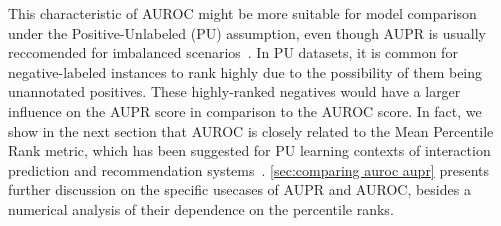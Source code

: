 
%
%
%
%


This characteristic of AUROC might be more suitable for model comparison under the Positive-Unlabeled (PU) assumption, even though AUPR is usually reccomended for imbalanced scenarios~\cite{he2009learning,saito2015precision,fernandez2018learning}.
In PU datasets, it is common for negative-labeled instances to rank highly due to the possibility of them being unannotated positives. These highly-ranked negatives would have a larger influence on the AUPR score in comparison to the AUROC score.
In fact, we show in the next section that AUROC is closely related to the Mean Percentile Rank metric, which has been suggested for PU learning contexts of interaction prediction and recommendation systems~\cite{pahikkala2015more,johnsonlogistic}. \autoref{sec:comparing auroc aupr} presents further discussion on the specific usecases of AUPR and AUROC, besides a numerical analysis of their dependence on the percentile ranks.


